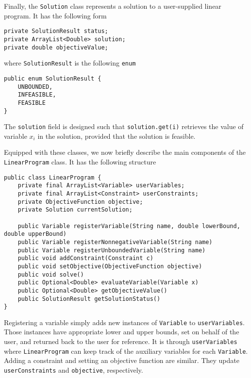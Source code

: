 \documentclass{article}
\newcommand{\javaCode}[1]{\texttt{#1}}
\begin{document}
Finally, the \javaCode{Solution} class represents a solution to a user-supplied linear program. It has the following form
\begin{verbatim}
private SolutionResult status;
private ArrayList<Double> solution;
private double objectiveValue;
\end{verbatim}
where \javaCode{SolutionResult} is the following \javaCode{enum}
\begin{verbatim}
public enum SolutionResult {
    UNBOUNDED,
    INFEASIBLE,
    FEASIBLE
}
\end{verbatim}
The \javaCode{solution} field is designed such that \javaCode{solution.get(i)} retrieves the value of variable $x_i$ in the solution, provided that the solution is feasible.

Equipped with these classes, we now briefly describe the main components of the \javaCode{LinearProgram} class. It has the following structure
\begin{verbatim}
public class LinearProgram {
    private final ArrayList<Variable> userVariables;
    private final ArrayList<Constraint> userConstraints;
    private ObjectiveFunction objective;
    private Solution currentSolution;
    
    public Variable registerVariable(String name, double lowerBound, double upperBound)
    public Variable registerNonnegativeVariable(String name)
    public Variable registerUnboundedVariable(String name)
    public void addConstraint(Constraint c)
    public void setObjective(ObjectiveFunction objective)
    public void solve()
    public Optional<Double> evaluateVariable(Variable x)
    public Optional<Double> getObjectiveValue()
    public SolutionResult getSolutionStatus()
}
\end{verbatim}
Registering a variable simply adds new instances of \javaCode{Variable} to \javaCode{userVariables}. Those instances have appropriate lower and upper bounds, set on behalf of the user, and returned back to the user for reference. It is through \javaCode{userVariables} where \javaCode{LinearProgram} can keep track of the auxiliary variables for each \javaCode{Variable}. Adding a constraint and setting an objective function are similar. They update \javaCode{userConstraints} and \javaCode{objective}, respectively. 
\end{document}
